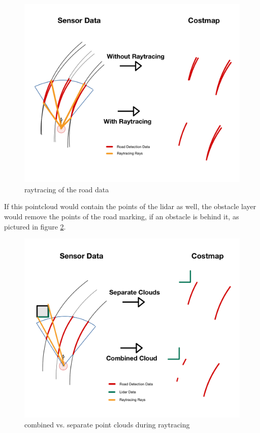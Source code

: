 \begin{figure}[H]
	\centering
	\includegraphics[width=.9\textwidth]{Pictures/raytracing road}
	\caption{raytracing of the road data}
	\label{raytracing}
\end{figure}

If this pointcloud would contain the points of the lidar as well, the obstacle layer would remove the points of the road marking, if an obstacle is behind it, as pictured in figure \ref{raytracing}.\\

\begin{figure}[H]
	\centering
	\includegraphics[width=.9\textwidth]{Pictures/raytracing}
	\caption{combined vs. separate point clouds during raytracing}
	\label{raytracing}
\end{figure}

